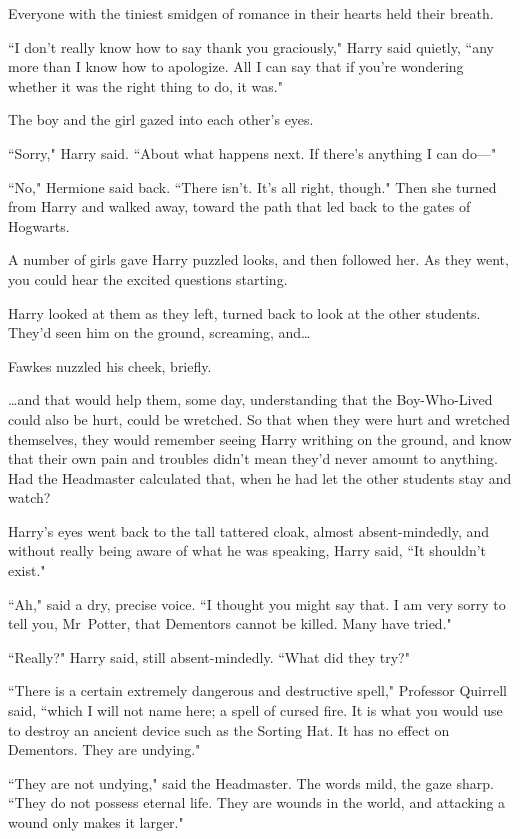 Everyone with the tiniest smidgen of romance in their hearts held their breath.

``I don't really know how to say thank you graciously," Harry said quietly, ``any more than I know how to apologize. All I can say that if you're wondering whether it was the right thing to do, it was."

The boy and the girl gazed into each other's eyes.

``Sorry," Harry said. ``About what happens next. If there's anything I can do—"

``No," Hermione said back. ``There isn't. It's all right, though." Then she turned from Harry and walked away, toward the path that led back to the gates of Hogwarts.

A number of girls gave Harry puzzled looks, and then followed her. As they went, you could hear the excited questions starting.

Harry looked at them as they left, turned back to look at the other students. They'd seen him on the ground, screaming, and{\ldots}

Fawkes nuzzled his cheek, briefly.

{\ldots}and that would help them, some day, understanding that the Boy-Who-Lived could also be hurt, could be wretched. So that when they were hurt and wretched themselves, they would remember seeing Harry writhing on the ground, and know that their own pain and troubles didn't mean they'd never amount to anything. Had the Headmaster calculated that, when he had let the other students stay and watch?

Harry's eyes went back to the tall tattered cloak, almost absent-mindedly, and without really being aware of what he was speaking, Harry said, ``It shouldn't exist."

``Ah," said a dry, precise voice. ``I thought you might say that. I am very sorry to tell you, Mr~Potter, that Dementors cannot be killed. Many have tried."

``Really?" Harry said, still absent-mindedly. ``What did they try?"

``There is a certain extremely dangerous and destructive spell," Professor Quirrell said, ``which I will not name here; a spell of cursed fire. It is what you would use to destroy an ancient device such as the Sorting Hat. It has no effect on Dementors. They are undying."

``They are not undying," said the Headmaster. The words mild, the gaze sharp. ``They do not possess eternal life. They are wounds in the world, and attacking a wound only makes it larger."


